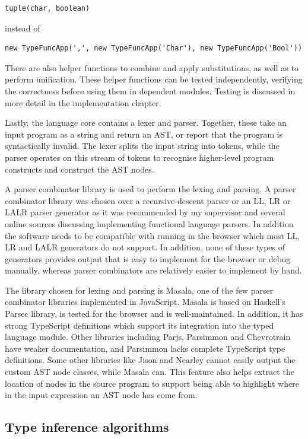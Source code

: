 \documentclass[a4paper,fleqn,oneside,12pt]{report}
\begin{document}
\begin{verbatim}
tuple(char, boolean)
\end{verbatim}
instead of

\begin{verbatim}
new TypeFuncApp(',', new TypeFuncApp('Char'), new TypeFuncApp('Bool'))
\end{verbatim}
There are also helper functions to combine and apply substitutions, as well as to perform unification. These helper functions can be tested independently, verifying the correctness before using them in dependent modules. Testing is discussed in more detail in the implementation chapter.

Lastly, the language core contains a lexer and parser. Together, these take an input program as a string and return an AST, or report that the program is syntactically invalid. The lexer splits the input string into tokens, while the parser operates on this stream of tokens to recognise higher-level program constructs and construct the AST nodes.

A parser combinator library is used to perform the lexing and parsing. A parser combinator library was chosen over a recursive descent parser or an LL, LR or LALR parser generator as it was recommended by my supervisor and several online sources discussing implementing functional language parsers. In addition the software needs to be compatible with running in the browser which most LL, LR and LALR generators do not support. In addition, none of these types of generators provides output that is easy to implement for the browser or debug manually, whereas parser combinators are relatively easier to implement by hand.

The library chosen for lexing and parsing is Masala, one of the few parser combinator libraries implemented in JavaScript. Masala is based on Haskell’s Parsec library, is tested for the browser and is well-maintained. In addition, it has strong TypeScript definitions which support its integration into the typed language module. Other libraries including Parjs, Parsimmon and Chevrotrain have weaker documentation, and Parsimmon lacks complete TypeScript type definitions. Some other libraries like Jison and Nearley cannot easily output the custom AST node classes, while Masala can. This feature also helps extract the location of nodes in the source program to support being able to highlight where in the input expression an AST node has come from.

\subsection{Type inference algorithms}\label{id:h.75leuokwbltp}
\end{document}
